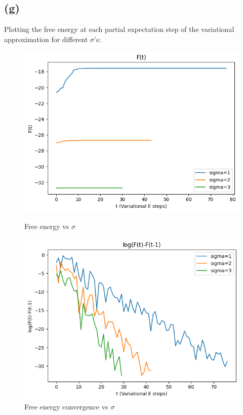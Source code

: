 \documentclass[12pt]{article}
\begin{document}
\newpage
\subsection*{(g)}


Plotting the free energy at each partial expectation step of the variational approximation for different $\sigma$'s:

\begin{figure}[h]
\centering
\begin{minipage}{.5\textwidth}
  \centering
\includegraphics[scale=0.4]{outputs/q3/g-free-energy-sigma}
\caption{Free energy vs $\sigma$}
\label{fig:3g-free-energy-diff-sigma}
\end{minipage}%
\begin{minipage}{.5\textwidth}
  \centering
\includegraphics[scale=0.4]{outputs/q3/g-free-energy-diff-sigma}
\caption{Free energy convergence vs $\sigma$}
\label{fig:3g-free-energy-diff-sigma}
\end{minipage}
\end{figure}
\end{document}
